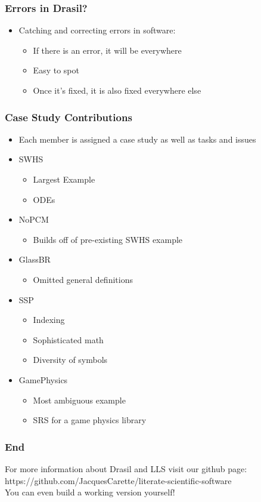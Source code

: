 \documentclass{beamer}
\begin{document}
\begin{frame}
\frametitle{Errors in Drasil?}
\begin{itemize}
 \item<1-> Catching and correcting errors in software:\linebreak
  \begin{itemize}
   \item<2-> If there is an error, it will be everywhere\linebreak
   \item<3-> Easy to spot\linebreak
   \item<4-> Once it's fixed, it is also fixed everywhere else\linebreak
  \end{itemize}
\end{itemize}
\end{frame}

\begin{frame}
\frametitle{Case Study Contributions}
\begin{itemize}
\item Each member is assigned a case study as well as tasks and issues
\item<1-> SWHS
  \begin{itemize}
    \item Largest Example
    \item ODEs
  \end{itemize}
\item<2-> NoPCM
  \begin{itemize}
    \item Builds off of pre-existing SWHS example
  \end{itemize}
\item<3-> GlassBR
  \begin{itemize}
    \item Omitted general definitions
  \end{itemize}
\item<4-> SSP
  \begin{itemize}
    \item Indexing
    \item Sophisticated math
    \item Diversity of symbols
  \end{itemize}
\item<5-> GamePhysics
  \begin{itemize}
    \item Most ambiguous example
    \item SRS for a game physics library
  \end{itemize}
\end{itemize}
\end{frame}

\begin{frame}
\frametitle{End}
For more information about Drasil and LLS visit our github page: \\
https://github.com/JacquesCarette/literate-scientific-software \\
\alert{You can even build a working version yourself!}
\end{frame}
\end{document}
